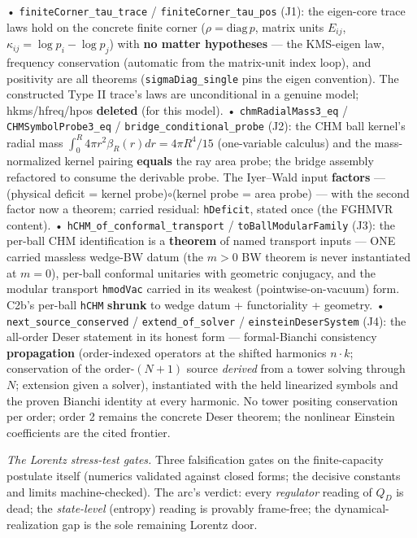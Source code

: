 \documentclass[11pt,a4paper]{article}
\begin{document}
  • \texttt{finiteCorner\_tau\_trace} / \texttt{finiteCorner\_tau\_pos} (J1): the eigen-core trace laws hold on the concrete finite corner ($\rho=\mathrm{diag}\,p$, matrix units $E_{ij}$, $\kappa_{ij}=\log p_i-\log p_j$) with \textbf{no matter hypotheses} — the KMS-eigen law, frequency conservation (automatic from the matrix-unit index loop), and positivity are all theorems (\texttt{sigmaDiag\_single} pins the eigen convention). The constructed Type II trace's laws are unconditional in a genuine model; hkms/hfreq/hpos \textbf{deleted} (for this model).
  • \texttt{chmRadialMass3\_eq} / \texttt{CHMSymbolProbe3\_eq} / \texttt{bridge\_conditional\_probe} (J2): the CHM ball kernel's radial mass $\int_0^R 4\pi r^2\beta_R(r)dr=4\pi R^4/15$ (one-variable calculus) and the mass-normalized kernel pairing \textbf{equals} the ray area probe; the bridge assembly refactored to consume the derivable probe. The Iyer--Wald input \textbf{factors} — (physical deficit = kernel probe)$\circ$(kernel probe = area probe) — with the second factor now a theorem; carried residual: \texttt{hDeficit}, stated once (the FGHMVR content).
  • \texttt{hCHM\_of\_conformal\_transport} / \texttt{toBallModularFamily} (J3): the per-ball CHM identification is a \textbf{theorem} of named transport inputs — ONE carried massless wedge-BW datum (the $m>0$ BW theorem is never instantiated at $m=0$), per-ball conformal unitaries with geometric conjugacy, and the modular transport \texttt{hmodVac} carried in its weakest (pointwise-on-vacuum) form. C2b's per-ball \texttt{hCHM} \textbf{shrunk} to wedge datum + functoriality + geometry.
  • \texttt{next\_source\_conserved} / \texttt{extend\_of\_solver} / \texttt{einsteinDeserSystem} (J4): the all-order Deser statement in its honest form — formal-Bianchi consistency \textbf{propagation} (order-indexed operators at the shifted harmonics $n\cdot k$; conservation of the order-$(N{+}1)$ source \emph{derived} from a tower solving through $N$; extension given a solver), instantiated with the held linearized symbols and the proven Bianchi identity at every harmonic. No tower positing conservation per order; order 2 remains the concrete Deser theorem; the nonlinear Einstein coefficients are the cited frontier.

\emph{The Lorentz stress-test gates.} Three falsification gates on the finite-capacity postulate itself (numerics validated against closed forms; the decisive constants and limits machine-checked). The arc's verdict: every \emph{regulator} reading of $Q_D$ is dead; the \emph{state-level} (entropy) reading is provably frame-free; the dynamical-realization gap is the sole remaining Lorentz door.
\end{document}
